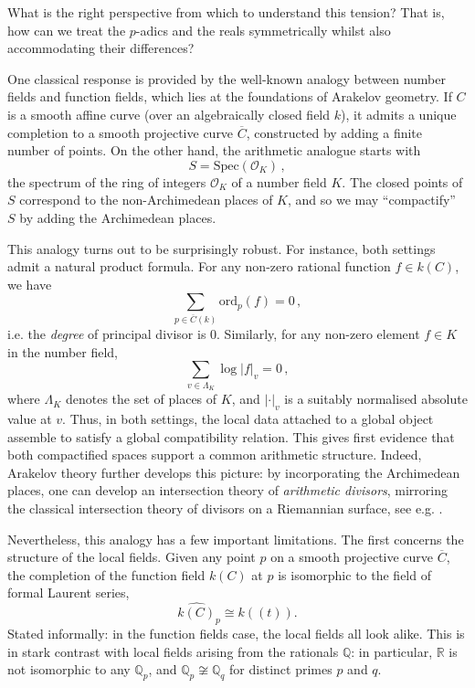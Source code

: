 \documentclass[a4paper, 11pt,reqno]{amsart}
\newcommand{\calO}{{\mathcal{O}}}
\newcommand{\Spec}{\mathrm{Spec}}
\newcommand{\ord}{\mathrm{ord}}
\newcommand{\R}{\mathbb{R}}
\newcommand{\Q}{\mathbb{Q}}
\begin{document}
\begin{question}\label{qn:TENSION} What is the right perspective from which to understand this tension? That is, how can we treat the $p$-adics and the reals symmetrically whilst also accommodating their differences? 
\end{question}

One classical response is provided by the well-known analogy between number fields and function fields, which lies at the foundations of Arakelov geometry. If $C$ is a smooth affine curve (over an algebraically closed field $k$), it admits a unique completion to a smooth projective curve $\overline{C}$, constructed by adding a finite number of points. On the other hand, the arithmetic analogue starts with 
$$S=\Spec(\calO_K)\,,$$
the spectrum of the ring of integers $\calO_K$ of a number field $K$. The closed points of $S$ correspond to the non-Archimedean places of $K$, and so we may ``compactify'' $S$ by adding the Archimedean places. 


This analogy turns out to be surprisingly robust. For instance, both settings admit a natural product formula. For any non-zero rational function $f\in k(C)$, we have
$$ \sum_{p\in\overline{C}(k)}\ord_p(f)=0\,,$$
i.e. the {\em degree} of principal divisor is 0. Similarly, for any non-zero element $f\in K$ in the number field,
$$\sum_{v\in \Lambda_K} \log|f|_v =0\,,$$
where $\Lambda_K$ denotes the set of places of $K$, and $|\cdot|_v$ is a suitably normalised absolute value at $v$. Thus, in both settings, the local data attached to a global object assemble to satisfy a global compatibility relation. This gives first evidence that both compactified spaces support a common arithmetic structure. Indeed, Arakelov theory further develops this picture: by incorporating the Archimedean places, one can develop an intersection theory of {\em arithmetic divisors}, mirroring the classical intersection theory of divisors on a Riemannian surface, see e.g. \cite{Arakelov,ArakelovDiophantine}.

Nevertheless, this analogy has a few important limitations. The first concerns the structure of the local fields. Given any point $p$ on a smooth projective curve $\overline{C}$, the completion of the function field $k(C)$ at $p$ is isomorphic to the field of formal Laurent series, 
$$\widehat{k(C)}_p\cong k((t)).$$
 Stated informally: in the function fields case, the local fields all look alike. This is in stark contrast with local fields arising from the rationals $\Q$: in particular, $\R$ is not isomorphic to any $\Q_p$, and $\Q_p\not\cong \Q_q$ for distinct primes $p$ and $q$. 
 
\end{document}
